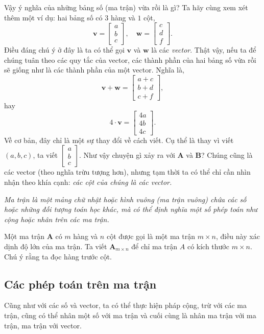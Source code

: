 Vậy ý nghĩa của những bảng số (ma trận) vừa rồi là gì? Ta hãy cùng xem xét thêm một ví dụ: hai bảng số có \(3\) hàng và \(1\) cột, 
\[\mathbf{v}=\begin{bmatrix}
    a\\b\\c
\end{bmatrix}, \quad \mathbf{w}=\begin{bmatrix}
    c\\d\\f
\end{bmatrix}.
\] Điều đáng chú ý ở đây là ta có thể gọi \(\mathbf{v}\) và \(\mathbf{w}\) là các \emph{vector}. Thật vậy, nếu ta để chúng tuân theo các quy tắc của vector, các thành phần của hai bảng số vừa rồi sẽ giống như là các thành phần của một vector. 
Nghĩa là, \[\mathbf{v}+\mathbf{w}=\begin{bmatrix}
    a+c\\b+d\\c+f
\end{bmatrix},\] hay \[
    4\cdot\mathbf{v}=\begin{bmatrix}
        4a\\4b\\4c
\end{bmatrix}.\]
Về cơ bản, đây chỉ là một sự thay đổi về cách viết. Cụ thể là thay vì viết \((a,b,c)\), ta viết \(\begin{bmatrix}
    a\\b\\c
\end{bmatrix}\). Như vậy chuyện gì xảy ra với  \(\mathbf{A}\) và \(\mathbf{B} \)? Chúng cũng là các vector (theo nghĩa trừu tượng hơn), nhưng tạm thời ta có thể chỉ cần nhìn nhận theo khía cạnh: \emph{các cột của chúng là các vector. }
\vspace{8pt}

    \emph{Ma trận là một mảng chữ nhật hoặc hình vuông (ma trận vuông) chứa các số hoặc những đối tượng toán học khác, mà có thể định nghĩa một số phép toán như cộng hoặc nhân trên các ma trận.}
\vspace{8pt}

Một ma trận \(\mathbf{A}\) có \(m\) hàng và \(n\) cột được gọi là một ma trận \(m\times n\), điều này xác dịnh độ lớn của ma trận. Ta viết \(\mathbf{A}_{m\times n}\) để chỉ ma trận \(A\) có kích thước \(m\times n\). Chú ý rằng ta đọc hàng trước cột. 


\subsection{Các phép toán trên ma trận}
Cũng như với các số và vector, ta có thể thực hiện pháp cộng, trừ với các ma trận, cũng có thể nhân một số với ma trận và cuối cùng là nhân ma trận với ma trận, ma trận với vector. 
\vspace{8pt}

